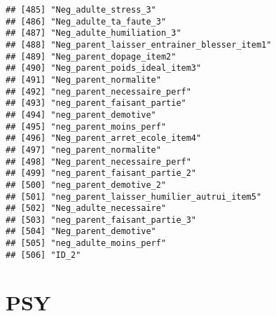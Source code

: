 \documentclass[
]{article}
\begin{document}
\begin{verbatim}
## [485] "Neg_adulte_stress_3"                                 
## [486] "Neg_adulte_ta_faute_3"                               
## [487] "Neg_adulte_humiliation_3"                            
## [488] "Neg_parent_laisser_entrainer_blesser_item1"          
## [489] "Neg_parent_dopage_item2"                             
## [490] "Neg_parent_poids_ideal_item3"                        
## [491] "Neg_parent_normalite"                                
## [492] "neg_parent_necessaire_perf"                          
## [493] "neg_parent_faisant_partie"                           
## [494] "neg_parent_demotive"                                 
## [495] "neg_parent_moins_perf"                               
## [496] "Neg_parent_arret_ecole_item4"                        
## [497] "neg_parent_normalite"                                
## [498] "Neg_parent_necessaire_perf"                          
## [499] "neg_parent_faisant_partie_2"                         
## [500] "neg_parent_demotive_2"                               
## [501] "neg_parent_laisser_humilier_autrui_item5"            
## [502] "Neg_adulte_necessaire"                               
## [503] "neg_parent_faisant_partie_3"                         
## [504] "Neg_parent_demotive"                                 
## [505] "neg_adulte_moins_perf"                               
## [506] "ID_2"
\end{verbatim}

\hypertarget{psy}{%
\section{PSY}\label{psy}}
\end{document}
